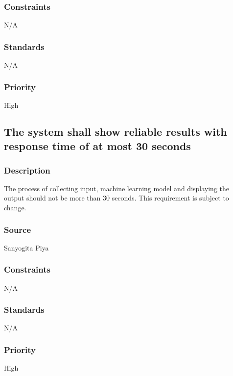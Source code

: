 \subsubsection{Constraints}
N/A
\subsubsection{Standards}
N/A
\subsubsection{Priority}
High


\subsection{The system shall show reliable results with response time of at most 30 seconds}

\subsubsection{Description}
The process of collecting input, machine learning model and displaying the output should not be more than 30 seconds. This requirement is subject to change.
\subsubsection{Source}
Sanyogita Piya
\subsubsection{Constraints}
N/A
\subsubsection{Standards}
N/A
\subsubsection{Priority}
High
